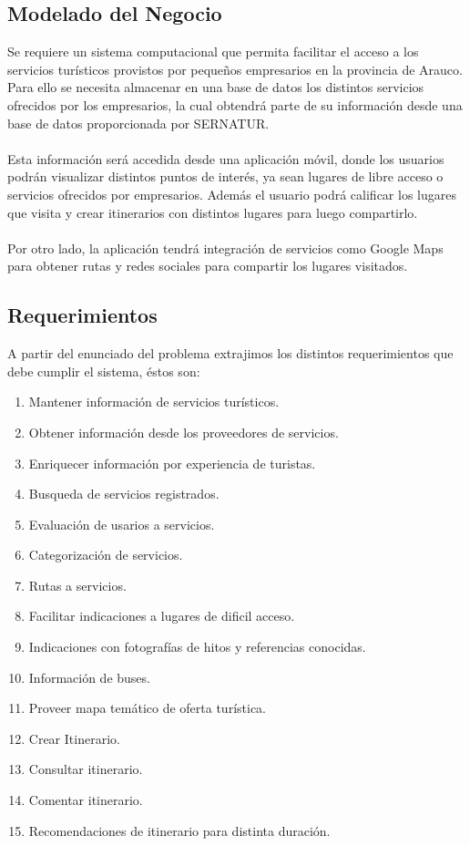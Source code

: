 \documentclass[12pt]{article}
\begin{document}
\subsection{Modelado del Negocio}
Se requiere un sistema computacional que permita facilitar el acceso a los servicios turísticos provistos por pequeños empresarios en la provincia de Arauco. Para ello se necesita almacenar en una base de datos los distintos servicios ofrecidos por los empresarios, la cual obtendrá parte de su información desde una base de datos proporcionada por SERNATUR.\\\\
Esta información será accedida desde una aplicación móvil, donde los usuarios podrán visualizar distintos puntos de interés, ya sean lugares de libre acceso o servicios ofrecidos por empresarios. Además el usuario podrá calificar los lugares que visita y crear itinerarios con distintos lugares para luego compartirlo.\\\\
Por otro lado, la aplicación tendrá integración de servicios como Google Maps para obtener rutas y redes sociales para compartir los lugares visitados.
\subsection{Requerimientos}
A partir del enunciado del problema extrajimos los distintos requerimientos que debe cumplir el sistema, éstos son:
\begin{enumerate}
\item Mantener información de servicios turísticos.
\item Obtener información desde los proveedores de servicios.
\item Enriquecer información por experiencia de turistas.
\item Busqueda de servicios registrados.
\item Evaluación de usarios a servicios.
\item Categorización de servicios.
\item Rutas a servicios.
\item Facilitar indicaciones a lugares de dificil acceso.
\item Indicaciones con fotografías de hitos y referencias conocidas.
\item Información de buses.
\item Proveer mapa temático de oferta turística.
\item Crear Itinerario.
\item Consultar itinerario.
\item Comentar itinerario.
\item Recomendaciones de itinerario para distinta duración.
\end{enumerate}
\end{document}
